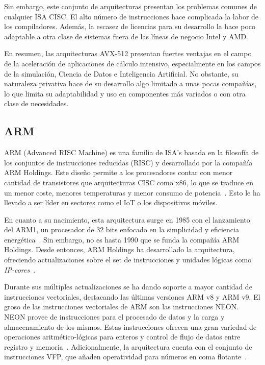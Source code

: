 Sin embargo, este conjunto de arquitecturas presentan los problemas comunes de
cualquier ISA CISC\@. El alto número de instrucciones hace complicada la
labor de los compiladores. Además, la escasez de licencias para su desarrollo
la hace poco adaptable a otra clase de sistemas fuera de las líneas de negocio
Intel y AMD\@.

En resumen, las arquitecturas AVX-512 presentan fuertes ventajas en el campo de
la aceleración de aplicaciones de cálculo intensivo, especialmente en los
campos de la simulación, Ciencia de Datos e Inteligencia Artificial. No
obstante, su naturaleza privativa hace de su desarrollo algo limitado a unas
pocas compañías, lo que limita su adaptabilidad y uso en componentes más variados
o con otra clase de necesidades.

\subsection{ARM}

ARM (Advanced RISC Machine) es una familia de ISA's basada en la filosofía de
los conjuntos de instrucciones reducidas (RISC) y desarrollado por la compañía
ARM Holdings. Este diseño permite a los procesadores contar con menor cantidad
de transistores que arquitecturas CISC como x86, lo que se traduce en un menor
coste, menores temperaturas y menor consumo de potencia~\cite{kaushikcase}.
Esto le ha llevado a ser líder en sectores como el IoT o los dispositivos
móviles.

En cuanto a su nacimiento, esta arquitectura surge en 1985 con el lanzamiento
del ARM1, un procesador de 32 bits enfocado en la simplicidad y eficiencia
energética~\cite{arm-history}. Sin embargo, no es hasta 1990 que se funda la
compañía ARM Holdings. Desde entonces, ARM Holdings ha desarrollado la
arquitectura, ofreciendo actualizaciones sobre el set de instrucciones y
unidades lógicas como \textit{IP-cores}~\cite{arm-history2}.

Durante sus múltiples actualizaciones se ha dando soporte a mayor cantidad
de instrucciones vectoriales, destacando las últimas versiones ARM v8 y ARM v9.
El groso de las instrucciones vectoriales de ARM son las instrucciones NEON\@.
NEON provee de instrucciones para el procesado de datos y la carga y
almacenamiento de los mismos. Estas instrucciones ofrecen una gran variedad de
operaciones aritmético-lógicas para enteros y control de flujo de datos entre
registro y memoria~\cite{arm-neon}\cite{arm-instructionsNEON}\@. Adicionalmente, la
arquitectura cuenta con el conjunto de instrucciones VFP, que añaden
operatividad para números en coma flotante~\cite{arm-vfp}.

